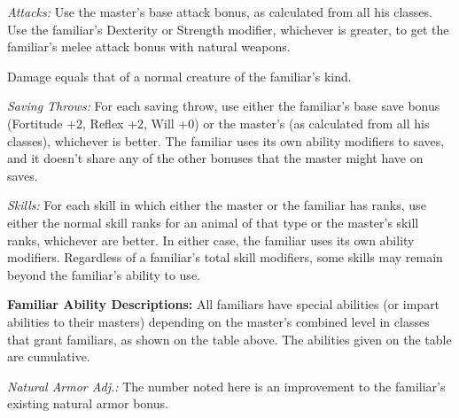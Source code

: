 \textit{Attacks:} Use the master's base attack bonus, as calculated from all his classes. Use the familiar's Dexterity or Strength modifier, whichever is greater, to get the familiar's melee attack bonus with natural weapons.

Damage equals that of a normal creature of the familiar's kind.

\textit{Saving Throws:} For each saving throw, use either the familiar's base save bonus (Fortitude +2, Reflex +2, Will +0) or the master's (as calculated from all his classes), whichever is better. The familiar uses its own ability modifiers to saves, and it doesn't share any of the other bonuses that the master might have on saves.

\textit{Skills:} For each skill in which either the master or the familiar has ranks, use either the normal skill ranks for an animal of that type or the master's skill ranks, whichever are better. In either case, the familiar uses its own ability modifiers. Regardless of a familiar's total skill modifiers, some skills may remain beyond the familiar's ability to use.


\textbf{Familiar Ability Descriptions:} All familiars have special abilities (or impart abilities to their masters) depending on the master's combined level in classes that grant familiars, as shown on the table above. The abilities given on the table are cumulative.

\textit{Natural Armor Adj.:} The number noted here is an improvement to the familiar's existing natural armor bonus.

